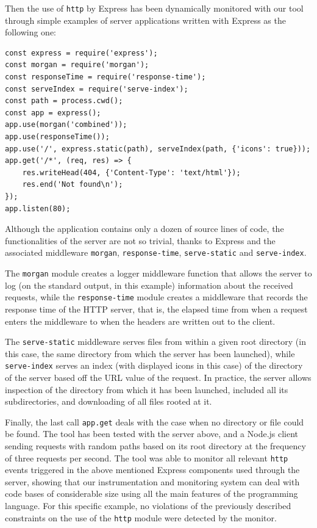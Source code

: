 Then the use of \lstinline{http} by Express has been dynamically monitored with our tool through simple
examples of server applications written with Express as the following one:
\begin{lstlisting}
const express = require('express');
const morgan = require('morgan');
const responseTime = require('response-time');
const serveIndex = require('serve-index');
const path = process.cwd();
const app = express();
app.use(morgan('combined'));
app.use(responseTime());
app.use('/', express.static(path), serveIndex(path, {'icons': true}));
app.get('/*', (req, res) => {
    res.writeHead(404, {'Content-Type': 'text/html'});
    res.end('Not found\n');
});
app.listen(80);
\end{lstlisting}
Although the application contains only a dozen of source lines of code, the
functionalities of the server are not so trivial, thanks to Express and the
associated middleware \lstinline{morgan}, \lstinline{response-time}, \lstinline{serve-static} and
\lstinline{serve-index}.

The \lstinline{morgan} module creates a logger middleware function that allows the server to log (on the standard output, in this example)
information about the received requests, while the \lstinline{response-time} module
creates a middleware that records the response time of the HTTP server, that is, the elapsed time from when a
request enters the middleware to when the headers are written out to the client.

The  \lstinline{serve-static} middleware serves files from within a given root directory (in this case, the same directory
from which the server has been launched), while \lstinline{serve-index} serves an index (with displayed icons in this case)
of the directory of the server based off the URL value of the request. In practice, the server allows inspection of the directory
from which it has been launched, included all its subdirectories, and downloading of all files rooted at it. 

Finally, the last call \lstinline{app.get} deals with the case when no directory or file could be found.
The tool has been tested with the server above, and a Node.js client sending requests with random  paths based on its root directory at the frequency of three requests per second.
The tool was able to monitor all relevant \lstinline{http} events triggered in the above mentioned Express components used through the server, showing that our instrumentation and monitoring system can deal with code bases of considerable size using all the main features of the programming language.
For this specific example, no violations of the previously described constraints on the use of the \lstinline{http} module were detected by the monitor.


